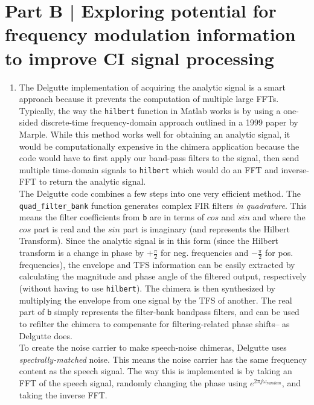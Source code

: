 \documentclass[9pt]{extarticle}
\begin{document}
\section{Part B | Exploring potential for frequency modulation information to improve CI signal processing}

\begin{enumerate}[label = \alph*)]

\item The Delgutte implementation of acquiring the analytic signal is a smart approach because it prevents the computation of multiple large FFTs. Typically, the way the \verb|hilbert| function in Matlab works is by using a one-sided discrete-time frequency-domain approach outlined in a 1999 paper by Marple. While this method works well for obtaining an analytic signal, it would be computationally expensive in the chimera application because the code would have to first apply our band-pass filters to the signal, then send multiple time-domain signals to \verb|hilbert| which would do an FFT and inverse-FFT to return the analytic signal. \\

The Delgutte code combines a few steps into one very efficient method. The \verb|quad_filter_bank| function generates complex FIR filters \textit{in quadrature}. This means the filter coefficients from \verb|b| are in terms of $cos$ and $sin$ and where the $cos$ part is real and the $sin$ part is imaginary (and represents the Hilbert Transform). Since the analytic signal is in this form (since the Hilbert transform is a change in phase by $+\frac{\pi}{2}$ for neg. frequencies and $-\frac{\pi}{2}$ for pos. frequencies), the envelope and TFS information can be easily extracted by calculating the magnitude and phase angle of the filtered output, respectively (without having to use \verb|hilbert|). The chimera is then synthesized by multiplying the envelope from one signal by the TFS of another. The real part of \verb|b| simply represents the filter-bank bandpass filters, and can be used to refilter the chimera to compensate for filtering-related phase shifts-- as Delgutte does. \\

To create the noise carrier to make speech-noise chimeras, Delgutte uses \textit{spectrally-matched} noise. This means the noise carrier has the same frequency content as the speech signal. The way this is implemented is by taking an FFT of the speech signal, randomly changing the phase using $e^{2\pi j \omega_{random}}$, and taking the inverse FFT. 


\end{enumerate}
\end{document}
